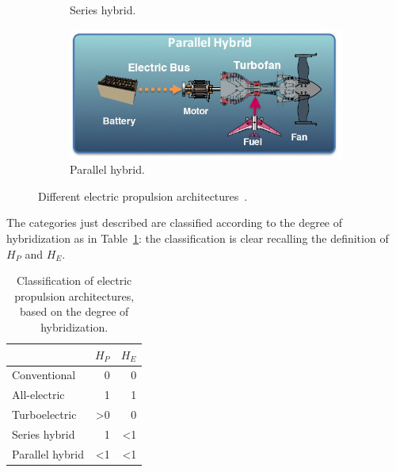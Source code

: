 \begin{figure}[!h]
\begin{subfigure}{0.3\textwidth}
		\caption{Series hybrid.}
		\label{fig:series_hybrid}
	\end{subfigure}
	\hspace{10mm}
	\begin{subfigure}{0.3\textwidth}
		\centering
		\includegraphics[width=\linewidth, height=0.15\textheight]{images/chap1/parallel_hybrid.jpg}
		\caption{Parallel hybrid.}
		\label{fig:parallel_hybrid}
	\end{subfigure}
	\caption{Different electric propulsion architectures~\cite{bib:madavan}.}
	\label{fig:he_architectures}
\end{figure}

The categories just described are classified according to the degree of hybridization as in Table~\ref{tab:he_architectures}: the classification is clear recalling the definition of $H_P$ and $H_E$.
\begin{table}[!h]
	\centering
	\begin{tabular}{l r r}
		\hline
		& $H_P$ & $H_E$ \\
		\hline
		Conventional & 0 & 0 \\
		All-electric & 1 & 1 \\
		Turboelectric & >0 & 0 \\
		Series hybrid & 1 & <1 \\
		Parallel hybrid & <1 & <1 \\
		\hline
	\end{tabular}
	\caption{Classification of electric propulsion architectures, based on the degree of hybridization.}
	\label{tab:he_architectures}
\end{table}

